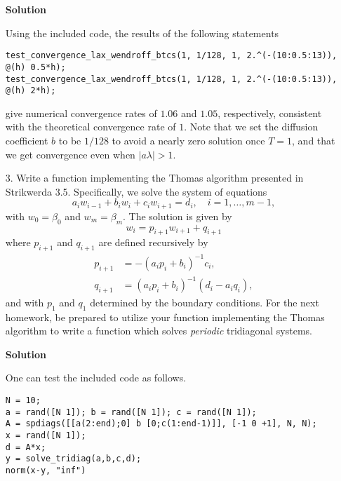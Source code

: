 \documentclass{article}
\providecommand{\abs}[1]{\left\lvert#1\right\rvert}
\begin{document}
\begin{itemize}
\textbf{Solution}

Using the included code, the results of the following statements
\begin{verbatim}
test_convergence_lax_wendroff_btcs(1, 1/128, 1, 2.^(-(10:0.5:13)), @(h) 0.5*h);
test_convergence_lax_wendroff_btcs(1, 1/128, 1, 2.^(-(10:0.5:13)), @(h) 2*h);
\end{verbatim}
give numerical convergence rates of $1.06$ and $1.05$, respectively, consistent with the theoretical convergence rate of $1$. Note that we set the diffusion coefficient $b$ to be $1/128$ to avoid a nearly zero solution once $T = 1$, and that we get convergence even when $\abs{a\lambda} > 1$.

\item[3.] Write a function implementing the Thomas algorithm presented in Strikwerda 3.5. Specifically, we solve the system of equations
\begin{equation*}
a_i w_{i-1} + b_i w_i + c_i w_{i+1} = d_i, \quad i = 1, \dotsc, m-1,
\end{equation*}
with $w_0 = \beta_0$ and $w_m = \beta_m$. The solution is given by
\begin{equation*}
w_i = p_{i+1} w_{i+1} + q_{i+1}
\end{equation*}
where $p_{i+1}$ and $q_{i+1}$ are defined recursively by
\begin{align*}
p_{i+1} & = -\left( a_i p_i + b_i \right)^{-1} c_i, \\
q_{i+1} & = \left( a_i p_i + b_i \right)^{-1} \left( d_i - a_i q_i \right),
\end{align*}
and with $p_1$ and $q_1$ determined by the boundary conditions. For the next homework, be prepared to utilize your function implementing the Thomas algorithm to write a function which solves \emph{periodic} tridiagonal systems.

\textbf{Solution}

One can test the included code as follows.
\begin{verbatim}
N = 10;
a = rand([N 1]); b = rand([N 1]); c = rand([N 1]);
A = spdiags([[a(2:end);0] b [0;c(1:end-1)]], [-1 0 +1], N, N);
x = rand([N 1]);
d = A*x;
y = solve_tridiag(a,b,c,d);
norm(x-y, "inf")
\end{verbatim}

\end{itemize}
\end{document}
